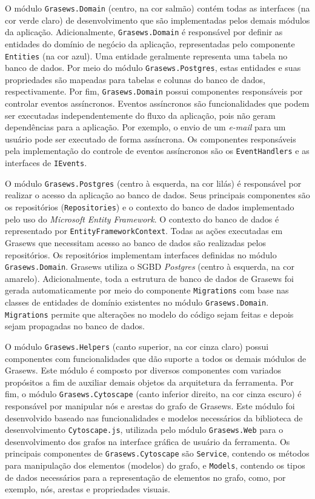 O módulo \texttt{Grasews.Domain} (centro, na cor salmão) contém todas as interfaces (na cor verde claro) de desenvolvimento que são implementadas pelos demais módulos da aplicação. Adicionalmente, \texttt{Grasews.Domain} é responsável por definir as entidades do domínio de negócio da aplicação, representadas pelo componente \texttt{Entities} (na cor azul). Uma entidade geralmente representa uma tabela no banco de dados. Por meio do módulo \texttt{Grasews.Postgres}, estas entidades e suas propriedades são mapeadas para tabelas e colunas do banco de dados, respectivamente. Por fim, \texttt{Grasews.Domain} possui componentes responsáveis por controlar eventos assíncronos. Eventos assíncronos são funcionalidades que podem ser executadas independentemente do fluxo da aplicação, pois não geram dependências para a aplicação. Por exemplo, o envio de um \textit{e-mail} para um usuário pode ser executado de forma assíncrona. Os componentes responsáveis pela implementação do controle de eventos assíncronos são os \texttt{EventHandlers} e as interfaces de \texttt{IEvents}.

O módulo \texttt{Grasews.Postgres} (centro à esquerda, na cor lilás) é responsável por realizar o acesso da aplicação ao banco de dados. Seus principais componentes são os repositórios (\texttt{Repositories}) e o contexto do banco de dados implementado pelo uso do \textit{Microsoft Entity Framework}. O contexto do banco de dados é representado por \texttt{EntityFrameworkContext}. Todas as ações executadas em Grasews que necessitam acesso ao banco de dados são realizadas pelos repositórios. Os repositórios implementam interfaces definidas no módulo \texttt{Grasews.Domain}. Grasews utiliza o SGBD \textit{Postgres} (centro à esquerda, na cor amarelo). Adicionalmente, toda a estrutura de banco de dados de Grasews foi gerada automaticamente por meio do componente \texttt{Migrations} com base nas classes de entidades de domínio existentes no módulo \texttt{Grasews.Domain}. \texttt{Migrations} permite que alterações no modelo do código sejam feitas e depois sejam propagadas no banco de dados.

O módulo \texttt{Grasews.Helpers} (canto superior, na cor cinza claro) possui componentes com funcionalidades que dão suporte a todos os demais módulos de Grasews. Este módulo é composto por diversos componentes com variados propósitos a fim de auxiliar demais objetos da arquitetura da ferramenta. Por fim, o módulo \texttt{Grasews.Cytoscape} (canto inferior direito, na cor cinza escuro) é responsável por manipular nós e arestas do grafo de Grasews. Este módulo foi desenvolvido baseado nas funcionalidades e modelos necessários da biblioteca de desenvolvimento \texttt{Cytoscape.js}, utilizada pelo módulo \texttt{Grasews.Web} para o desenvolvimento dos grafos na interface gráfica de usuário da ferramenta. Os principais componentes de \texttt{Grasews.Cytoscape} são \texttt{Service}, contendo os métodos para manipulação dos elementos (modelos) do grafo, e \texttt{Models}, contendo os tipos de dados necessários para a representação de elementos no grafo, como, por exemplo, nós, arestas e propriedades visuais.